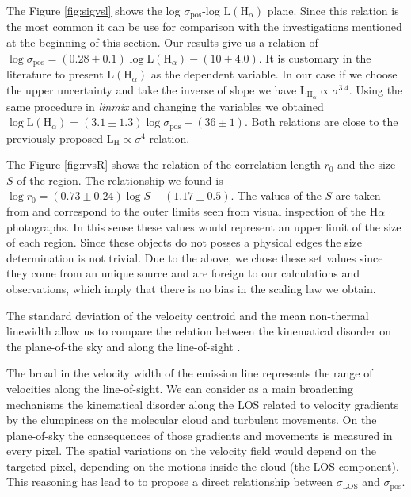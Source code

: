 \documentclass[fleqn,usenatbib, useAMS, a4paper]{mnras}
\newcommand\pos{\ensuremath{_{\mathrm{pos}}}}
\newcommand\ha{\ensuremath{\text{H}\alpha}}
\begin{document}
The Figure \ref{fig:sigvsl} shows the log \(\sigma\pos\)-log \(\text{L}(\text{H}_{\alpha})\) plane.
Since this relation is the most common it can be use for comparison with the investigations mentioned at the beginning of this section.
Our results give us a relation of \(\log \sigma\pos = (0.28 \pm 0.1) \log \text{L}(\text{H}_{\alpha})-(10 \pm 4.0)\).
It is customary in the literature to present \(\text{L} (\text{H}_{\alpha})\) as the dependent variable.
In our case if we choose the upper uncertainty and take the inverse of slope we have \(\text{L}_{\text{H}_{\alpha}} \propto \sigma^{3.4}\). 
Using the same procedure in \textit{linmix} and changing the variables we obtained \(\log \text{L}(\text{H}_{\alpha}) = (3.1\pm 1.3) \log \sigma\pos -(36 \pm 1)\).
Both relations are close to the previously proposed \(\text{L}_{\text{H}} \propto \sigma^{4}\) relation.

The Figure \ref{fig:rvsR} shows the relation of the correlation length \(r_0\) and the size \(S\) of the region. 
The relationship we found is \(\log r_0 = (0.73 \pm 0.24) \log S - (1.17 \pm 0.5)\).
The values of the \(S\) are taken from \citet{1984ApJ...287..116K} and correspond to the outer
limits seen from visual inspection of the \ha{} photographs.
In this sense these values would represent an upper limit of the size of each region.
Since these objects do not posses a physical edges the size determination is not trivial.
Due to the above, we chose these set values since they come from an unique source and are foreign to our calculations and observations, which imply that there is no bias in the scaling law we obtain.  


The standard deviation of the velocity centroid and the mean non-thermal linewidth allow us to compare the relation between the kinematical disorder on the plane-of-the sky and along the line-of-sight  \citep{2011MNRAS.413..705L}.

The broad in the velocity width of the emission line represents the range of velocities along the line-of-sight.%
We can consider as a main broadening mechanisms the kinematical disorder along the LOS related to velocity gradients by the clumpiness on the molecular cloud and turbulent movements.
On the plane-of-sky the consequences of those gradients and movements is measured in every pixel. 
The spatial variations on the velocity field would depend on the targeted pixel, depending on the motions inside the cloud (the LOS component).
This reasoning has lead to \citet{2011MNRAS.413..705L} to propose a direct relationship between \(\sigma_{\text{LOS}}\) and \(\sigma\pos\).
\end{document}

